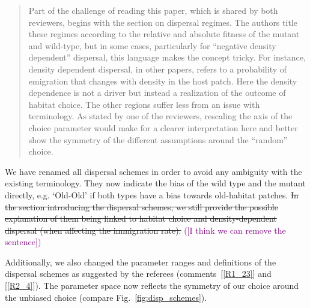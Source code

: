 \documentclass[11pt]{article}
\newenvironment{referee}{\vspace{0.cm} \sffamily \color{colreferee} \begin{quotation} }{\end{quotation} \vspace{0.cm}}
\newcommand{\lmarginpar}[1]{\reversemarginpar\marginpar{\textcolor{colreferee}{\textbf{\textsf{[#1]}}}}}
\newcommand{\addnb}[1]{\refstepcounter{numcom}\lmarginpar{\arabic{numcom}}\label{#1}}
\newcommand{\comref}[1]{[\ref{#1}]}
\newcommand{\florence}[1]{\textcolor{purple}{(#1)}}
\newcounter{numcom}
\begin{document}
\begin{referee}
Part \addnb{AE2}of the challenge of reading this paper, which is shared by both reviewers, begins with the section on dispersal regimes. The authors title these regimes according to the relative and absolute fitness of the mutant and wild-type, but in some cases, particularly for “negative density dependent” dispersal, this language makes the concept tricky. For instance, density dependent dispersal, in other papers, refers to a probability of emigration that changes with density in the host patch. Here the density dependence is not a driver but instead a realization of the outcome of habitat choice. The other regions suffer less from an issue with terminology. As stated by one of the reviewers, rescaling the axis of the choice parameter would make for a clearer interpretation here and better show the symmetry of the different assumptions around the “random” choice.    
\end{referee}
%
We have renamed all dispersal schemes in order to avoid any ambiguity with the existing terminology. They now indicate the bias of the wild type and the mutant directly, e.g. `Old-Old' if both types have a bias towards old-habitat patches. \st{In the section introducing the dispersal schemes, we still provide the possible explanation of them being linked to habitat choice and density-dependent dispersal (when affecting the immigration rate).} \florence{[I think we can remove the sentence]}

Additionally, we also changed the parameter ranges and definitions of the dispersal schemes as suggested by the referees (comments~\comref{R1_23} and \comref{R2_4}). The parameter space now reflects the symmetry of our choice around the unbiased choice (compare Fig.~\ref{fig:disp_schemes}). 
\end{document}
